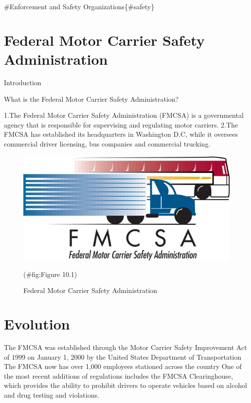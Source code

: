 \documentclass[
]{book}
\begin{document}
\#Enforcement and Safety Organizations\{\#safety\}

\hypertarget{safety-federal}{%
\section{Federal Motor Carrier Safety Administration}\label{safety-federal}}

Introduction

What is the Federal Motor Carrier Safety Administration?

1.The Federal Motor Carrier Safety Administration (FMCSA) is a governmental agency that is responsible for supervising and regulating motor carriers.
2.The FMCSA has established its headquarters in Washington D.C, while it oversees commercial driver licensing, bus companies and commercial trucking.

\begin{figure}

{\centering \includegraphics{./Images/Enforcement and Safety Organizations/Federal Motor Carrier Safety Administration} 

}

\caption{Federal Motor Carrier Safety Administration}(\#fig:Figure 10.1)
\end{figure}

\hypertarget{safety-evolution}{%
\section{Evolution}\label{safety-evolution}}

The FMCSA was established through the Motor Carrier Safety Improvement Act of 1999 on January 1, 2000 by the United States Department of Transportation
The FMCSA now has over 1,000 employees stationed across the country
One of the most recent additions of regulations includes the FMCSA Clearinghouse, which provides the ability to prohibit drivers to operate vehicles based on alcohol and drug testing and violations.
\end{document}

